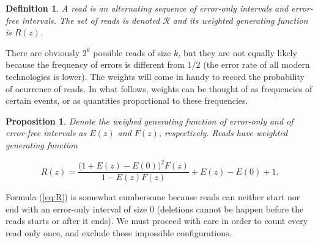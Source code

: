 \documentclass{article}
\newtheorem{definition}{Definition}
\newtheorem{proposition}{Proposition}
\begin{document}
\begin{definition}
\label{def:read}
A read is an alternating sequence of error-only intervals and error-free
intervals. The set of reads is denoted $\mathcal{R}$ and its weighted
generating function is $R(z)$.
\end{definition}

There are obviously $2^k$ possible reads of size $k$, but they are not
equally likely because the frequency of errors is different from $1/2$
(the error rate of all modern technologies is lower). The weights will
come in handy to record the probability of ocurrence of reads. In what
follows, weights can be thought of as frequencies of certain events, or as
quantities proportional to these frequencies.

\begin{proposition}
\label{th:R}
Denote the weighed generating function of error-only and of error-free
intervals as $E(z)$ and $F(z)$, respectively. Reads have weighted
generating function

\begin{equation}
\label{eq:R}
R(z) = \frac{\big(1+E(z)-E(0)\big)^2F(z)}{1-E(z)F(z)} + E(z)-E(0)+1.
\end{equation}
\end{proposition}

Formula (\ref{eq:R}) is somewhat cumbersome because reads can neither
start nor end with an error-only interval of size $0$ (deletions cannot be
happen before the reads starts or after it ends). We must proceed with
care in order to count every read only once, and exclude those impossible
configurations.
\end{document}
